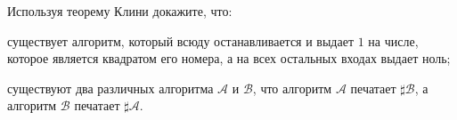 Используя теорему Клини докажите, что:
\begin{enumcyr}
    \item существует алгоритм, который всюду останавливается и выдает $1$ на числе, которое является квадратом его номера, а
	    на всех остальных входах выдает ноль;
    \item существуют два различных алгоритма $\mathcal{A}$ и $\mathcal{B}$, что алгоритм $\mathcal{A}$ печатает $\sharp
	    \mathcal{B}$, а алгоритм $\mathcal{B}$ печатает $\sharp \mathcal{A}$.
\end{enumcyr}